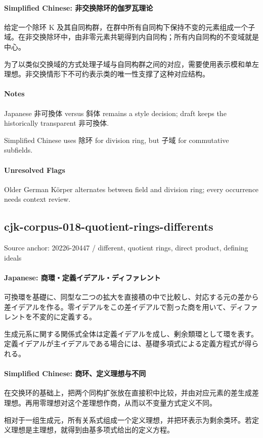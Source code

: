 \documentclass[11pt]{article}
\begin{document}
\paragraph{Simplified Chinese: 非交换除环的伽罗瓦理论}
给定一个除环 K 及其自同构群，在群中所有自同构下保持不变的元素组成一个子域。在非交换除环中，由非零元素共轭得到内自同构；所有内自同构的不变域就是中心。\par
为了以类似交换域的方式处理子域与自同构群之间的对应，需要使用表示模和单左理想。非交换情形下不可约表示类的唯一性支撑了这种对应结构。\par
\paragraph{Notes}
Japanese 非可換体 versus 斜体 remains a style decision; draft keeps the historically transparent 非可換体.\par
Simplified Chinese uses 除环 for division ring, but 子域 for commutative subfields.\par
\paragraph{Unresolved Flags}
Older German Körper alternates between field and division ring; every occurrence needs context review.\par
\subsection*{cjk-corpus-018-quotient-rings-differents}
Source anchor: 20226-20447 / different, quotient rings, direct product, defining ideals
\par
\paragraph{Japanese: 商環・定義イデアル・ディファレント}
可換環を基礎に、同型な二つの拡大を直接積の中で比較し、対応する元の差から差イデアルを作る。零イデアルをこの差イデアルで割った商を用いて、ディファレントを不変的に定義する。\par
生成元系に関する関係式全体は定義イデアルを成し、剰余類環として環を表す。定義イデアルが主イデアルである場合には、基礎多項式による定義方程式が得られる。\par
\paragraph{Simplified Chinese: 商环、定义理想与不同}
在交换环的基础上，把两个同构扩张放在直接积中比较，并由对应元素的差生成差理想。再用零理想对这个差理想作商，从而以不变量方式定义不同。\par
相对于一组生成元，所有关系式组成一个定义理想，并把环表示为剩余类环。若定义理想是主理想，就得到由基多项式给出的定义方程。\par
\end{document}
